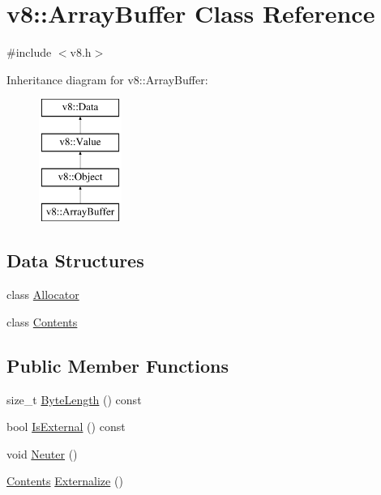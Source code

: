 \hypertarget{classv8_1_1ArrayBuffer}{\section{v8\-:\-:Array\-Buffer Class Reference}
\label{classv8_1_1ArrayBuffer}
}


{\ttfamily \#include $<$v8.\-h$>$}

Inheritance diagram for v8\-:\-:Array\-Buffer\-:\begin{figure}[H]
\begin{center}
\leavevmode
\includegraphics[height=4.000000cm]{classv8_1_1ArrayBuffer}
\end{center}
\end{figure}
\subsection*{Data Structures}
\begin{DoxyCompactItemize}
\item 
class \hyperlink{classv8_1_1ArrayBuffer_1_1Allocator}{Allocator}
\item 
class \hyperlink{classv8_1_1ArrayBuffer_1_1Contents}{Contents}
\end{DoxyCompactItemize}
\subsection*{Public Member Functions}
\begin{DoxyCompactItemize}
\item 
size\-\_\-t \hyperlink{classv8_1_1ArrayBuffer_ab73b98ba6436b57c5a1b3d29429e0199}{Byte\-Length} () const 
\item 
bool \hyperlink{classv8_1_1ArrayBuffer_a50dd263917559439525048c623425c6f}{Is\-External} () const 
\item 
void \hyperlink{classv8_1_1ArrayBuffer_a3420f7d38a8fe20e8f40fb82e6acb325}{Neuter} ()
\item 
\hyperlink{classv8_1_1ArrayBuffer_1_1Contents}{Contents} \hyperlink{classv8_1_1ArrayBuffer_a8b90b72486cfacb4fbec157f4803f889}{Externalize} ()
\end{DoxyCompactItemize}
